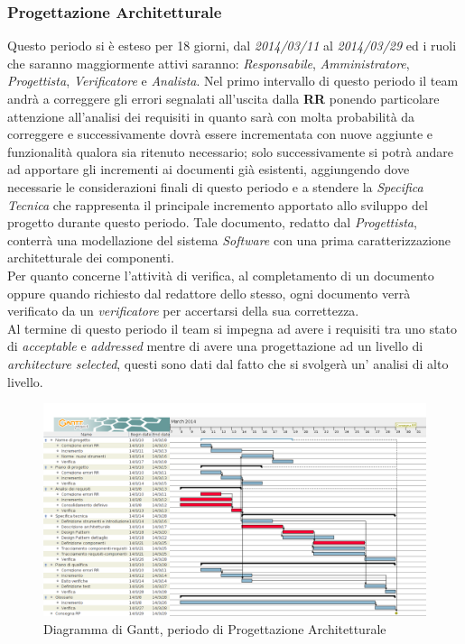 \subsubsection{Progettazione Architetturale}
Questo periodo si è esteso per 18 giorni, dal \textit{2014/03/11} al \textit{2014/03/29} ed i ruoli che saranno maggiormente attivi saranno: \textit{Responsabile}, \textit{Amministratore}, \textit{Progettista}, \textit{Verificatore} e \textit{Analista}. Nel primo intervallo di questo periodo il team andrà a correggere gli errori segnalati all'uscita dalla \textbf{RR} ponendo particolare attenzione all'analisi dei requisiti in quanto sarà con molta probabilità da correggere e successivamente dovrà essere incrementata con nuove aggiunte e funzionalità qualora sia ritenuto necessario; solo successivamente si potrà andare ad apportare gli incrementi ai documenti già esistenti, aggiungendo dove necessarie le considerazioni finali di questo periodo e a stendere la \textit{Specifica  Tecnica} che rappresenta il principale incremento apportato allo sviluppo del progetto durante questo periodo. Tale documento, redatto dal \textit{Progettista}, conterrà una modellazione del sistema \textit{Software} con una prima caratterizzazione architetturale dei componenti.\\
Per quanto concerne l'attività di verifica, al completamento di un documento oppure quando richiesto dal redattore dello stesso, ogni documento verrà verificato da un \textit{verificatore} per accertarsi della sua correttezza.\\
Al termine di questo periodo il team si impegna ad avere i requisiti tra uno stato di \textit{acceptable} e \textit{addressed} mentre di avere una progettazione ad un livello di \textit{architecture selected}, questi sono dati dal fatto che si svolgerà un' analisi di alto livello.\\
\begin{figure}[H] \centering \includegraphics[width=%
\textwidth]
{../modello/img/RP.png} \caption{Diagramma di Gantt, periodo di Progettazione Architetturale}
\end{figure}
